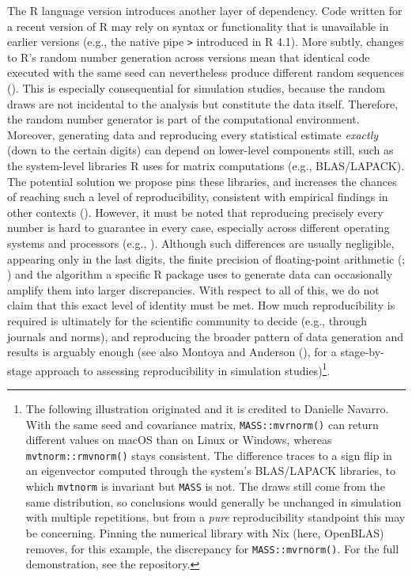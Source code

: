 \documentclass[
  man,
  longtable,
  nolmodern,
  notxfonts,
  notimes,
  colorlinks=true,linkcolor=blue,citecolor=blue,urlcolor=blue]{apa7}
\begin{document}
The R language version introduces another layer of dependency. Code
written for a recent version of R may rely on syntax or functionality
that is unavailable in earlier versions (e.g., the native pipe
\texttt{\textbar{}\textgreater{}} introduced in R 4.1). More subtly,
changes to R's random number generation across versions mean that
identical code executed with the same seed can nevertheless produce
different random sequences (). This is especially consequential for simulation
studies, because the random draws are not incidental to the analysis but
constitute the data itself. Therefore, the random number generator is
part of the computational environment. Moreover, generating data and
reproducing every statistical estimate \emph{exactly} (down to the
certain digits) can depend on lower-level components still, such as the
system-level libraries R uses for matrix computations (e.g.,
BLAS/LAPACK). The potential solution we propose pins these libraries,
and increases the chances of reaching such a level of reproducibility,
consistent with empirical findings in other contexts
(). However, it must
be noted that reproducing precisely every number is hard to guarantee in
every case, especially across different operating systems and processors
(e.g., ). Although such differences are usually negligible, appearing only
in the last digits, the finite precision of floating-point arithmetic
(;
) and the algorithm a
specific R package uses to generate data can occasionally amplify them
into larger discrepancies. With respect to all of this, we do not claim
that this exact level of identity must be met. How much reproducibility
is required is ultimately for the scientific community to decide (e.g.,
through journals and norms), and reproducing the broader pattern of data
generation and results is arguably enough (see also Montoya and Anderson
(), for a stage-by-stage
approach to assessing reproducibility in simulation studies)\footnote{The
  following illustration originated and it is credited to Danielle
  Navarro. With the same seed and covariance matrix,
  \texttt{MASS::mvrnorm()} can return different values on macOS than on
  Linux or Windows, whereas \texttt{mvtnorm::rmvnorm()} stays
  consistent. The difference traces to a sign flip in an eigenvector
  computed through the system's BLAS/LAPACK libraries, to which
  \texttt{mvtnorm} is invariant but \texttt{MASS} is not. The draws
  still come from the same distribution, so conclusions would generally
  be unchanged in simulation with multiple repetitions, but from a
  \emph{pure} reproducibility standpoint this may be concerning. Pinning
  the numerical library with Nix (here, OpenBLAS) removes, for this
  example, the discrepancy for \texttt{MASS::mvrnorm()}. For the full
  demonstration, see the repository.}.
\end{document}
